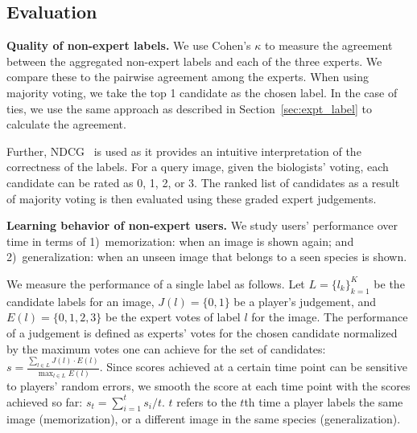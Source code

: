 \subsection{Evaluation}
\noindent
\textbf{Quality of non-expert labels.}
We use Cohen's $\kappa$ to measure the agreement between the 
aggregated non-expert labels and each of the three experts. 
We compare these to the pairwise agreement among the experts. 
When using majority voting, we take the top 1 candidate as the chosen label. 
In the case of ties, we use the same approach as described in Section~\ref{sec:expt_label} to 
calculate the agreement. 

Further, NDCG~\cite{Jarvelin02:ndcg} is used %
as it provides an intuitive interpretation of the correctness of the labels.
For a query image, given the biologists' voting, each candidate can be rated as 0, 1, 2, or 3. 
The ranked list of candidates as a result of majority voting
is then evaluated using these graded expert judgements.

\noindent
\textbf{Learning behavior of non-expert users.}
We study users' performance over time in terms of  
1)~memorization: when an image is shown again;
and 2)~generalization: when an unseen image that belongs to a seen species is shown.


We measure the performance of a single label as follows. 
Let $L=\{l_k\}_{k=1}^K$ be the candidate labels for an image, 
$J(l)=\{0, 1\}$ be a player's judgement, 
and $E(l)=\{0, 1, 2, 3\}$ be the expert votes of label $l$ for the image. 
The performance of a judgement is defined as
experts' votes for the chosen candidate normalized by the
maximum votes one can achieve for the set of candidates:
%
 $s =  \frac{\sum_{l \in L} J(l) \cdot E(l)}{\max_{l \in L} E(l)}$. 
%
%
Since scores achieved at a certain time point can be sensitive to players' random errors, 
we smooth the score at each time point with the scores achieved so far:
$s_t = \sum_{i=1}^t s_i / t$.
%
$t$ refers to the $t$th time a player labels the same image (memorization), or a different image in the same species (generalization). 
%

